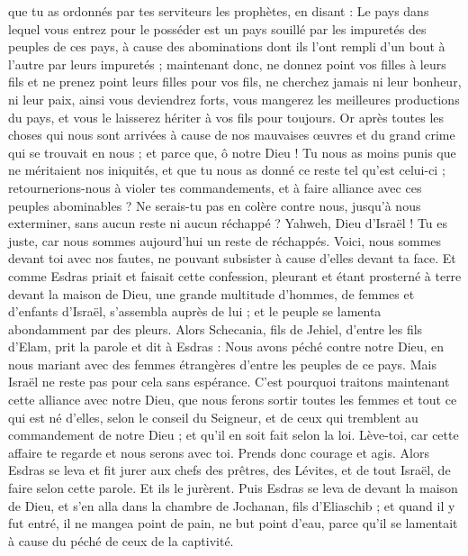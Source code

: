 \begin{multicols}{2}
que tu as ordonnés par tes serviteurs les prophètes, en disant : Le pays dans lequel vous entrez pour le posséder est un pays souillé par les impuretés des peuples de ces pays, à cause des abominations dont ils l'ont rempli d'un bout à l'autre par leurs impuretés ;
maintenant donc, ne donnez point vos filles à leurs fils et ne prenez point leurs filles pour vos fils, ne cherchez jamais ni leur bonheur, ni leur paix, ainsi vous deviendrez forts, vous mangerez les meilleures productions du pays, et vous le laisserez hériter à vos fils pour toujours.
Or après toutes les choses qui nous sont arrivées à cause de nos mauvaises œuvres et du grand crime qui se trouvait en nous ; et parce que, ô notre Dieu ! Tu nous as moins punis que ne méritaient nos iniquités, et que tu nous as donné ce reste tel qu'est celui-ci ;
retournerions-nous à violer tes commandements, et à faire alliance avec ces peuples abominables ? Ne serais-tu pas en colère contre nous, jusqu'à nous exterminer, sans aucun reste ni aucun réchappé ?
Yahweh, Dieu d'Israël ! Tu es juste, car nous sommes aujourd'hui un reste de réchappés. Voici, nous sommes devant toi avec nos fautes, ne pouvant subsister à cause d'elles devant ta face.
\VerseOne{}Et comme Esdras priait et faisait cette confession, pleurant et étant prosterné à terre devant la maison de Dieu, une grande multitude d'hommes, de femmes et d'enfants d'Israël, s'assembla auprès de lui ; et le peuple se lamenta abondamment par des pleurs.
Alors Schecania, fils de Jehiel, d'entre les fils d'Elam, prit la parole et dit à Esdras : Nous avons péché contre notre Dieu, en nous mariant avec des femmes étrangères d'entre les peuples de ce pays. Mais Israël ne reste pas pour cela sans espérance.
C'est pourquoi traitons maintenant cette alliance avec notre Dieu, que nous ferons sortir toutes les femmes et tout ce qui est né d'elles, selon le conseil du Seigneur, et de ceux qui tremblent au commandement de notre Dieu ; et qu'il en soit fait selon la loi.
Lève-toi, car cette affaire te regarde et nous serons avec toi. Prends donc courage et agis.
Alors Esdras se leva et fit jurer aux chefs des prêtres, des Lévites, et de tout Israël, de faire selon cette parole. Et ils le jurèrent.
Puis Esdras se leva de devant la maison de Dieu, et s'en alla dans la chambre de Jochanan, fils d'Eliaschib ; et quand il y fut entré, il ne mangea point de pain, ne but point d'eau, parce qu'il se lamentait à cause du péché de ceux de la captivité.

\end{multicols}
